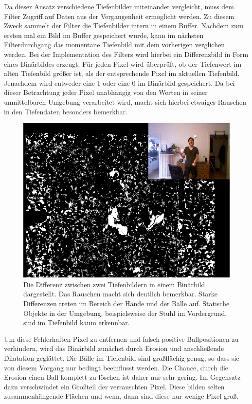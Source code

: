 \documentclass[12pt,a4paper,ngerman]{scrartcl}
\begin{document}
Da dieser Ansatz verschiedene Tiefenbilder miteinander vergleicht, muss dem Filter Zugriff auf Daten aus der Vergangenheit ermöglicht werden.
Zu diesem Zweck sammelt der Filter die Tiefenbilder intern in einem Buffer.
Nachdem zum ersten mal ein Bild im Buffer gespeichert wurde, kann im nächsten Filterdurchgang das momentane Tiefenbild mit dem vorherigen verglichen werden.
Bei der Implementation des Filters wird hierbei ein Differenzbild in Form eines Binärbildes erzeugt.
Für jeden Pixel wird überprüft, ob der Tiefenwert im alten Tiefenbild größer ist, als der entsprechende Pixel im aktuellen Tiefenbild.
Jenachdem wird entweder eine 1 oder eine 0 im Binärbild gespeichert.
Da bei dieser Betrachtung jeder Pixel unabhängig von den Werten in seiner unmittelbaren Umgebung verarbeitet wird, macht sich hierbei etwaiges Rauschen in den Tiefendaten besonders bemerkbar.

\begin{figure}[H]
    \centering
    \includegraphics[scale=0.7]{img/temporal_scene.png}
    \caption{Die Differenz zwischen zwei Tiefenbildern in einem Binärbild dargestellt. Das Rauschen macht sich deutlich bemerkbar. Starke Differenzen treten im Bereich der Hände und der Bälle auf. Statische Objekte in der Umgebung, beispielsweise der Stuhl im Vordergrund, sind im Tiefenbild kaum erkennbar.}
    \label{temporal_rauschen}
\end{figure}

Um diese Fehlerhaften Pixel zu entfernen und falsch positive Ballpositionen zu verhindern, wird das Binärbild zunächst durch Erosion und anschließende Dilatation geglättet.
Die Bälle im Tiefenbild sind großflächig genug, so dass sie von diesem Vorgang nur bedingt beeinflusst werden.
Die Chance, durch die Erosion einen Ball komplett zu löschen ist daher nur sehr gering.
Im Gegensatz dazu verschwindet ein Großteil der verrauschten Pixel.
Diese bilden selten zusammenhängende Flächen und wenn, dann sind diese nur wenige Pixel groß.
\end{document}
